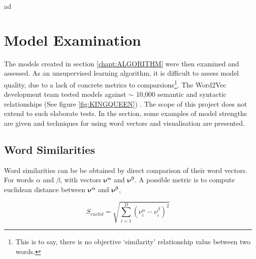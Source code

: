 ad\chapter{Model Examination}
\label{chapt:VALIDATION}
The models created in section \ref{chapt:ALGORITHM} were then examined and assessed. As an unsupervised learning algorithm, it is difficult to assess model quality, due to a lack of concrete metrics to comparsions\footnote{This is to say, there is no objective `similarity' relationship value between two words.}. The Word2Vec development team tested models against $\sim$ 10,000 semantic and syntactic relationships (See figure \ref{fig:KINGQUEEN})\cite{word2vec1} \cite{word2vec2} \cite{word2veckingqueen}. The scope of this project does not extend to such elaborate tests. In the section, some examples of model strengths are given and techniques for using word vectors and visualisation are presented. 
\section{Word Similarities}
Word similarities can be be obtained by direct comparison of their word vectors. For words $\alpha$ and $\beta$, with vectors $\mathbf{\nu^\alpha}$ and $\mathbf{\nu^\beta}$.  A possible metric is to compute euclidean distance between $\mathbf{\nu^\alpha}$ and $\mathbf{\nu^\beta}$, 

$$S_{euclid} = \sqrt{\sum_{i=1}^{D}(\nu_i^{\alpha}-\nu_i^{\beta})^{2}} $$

